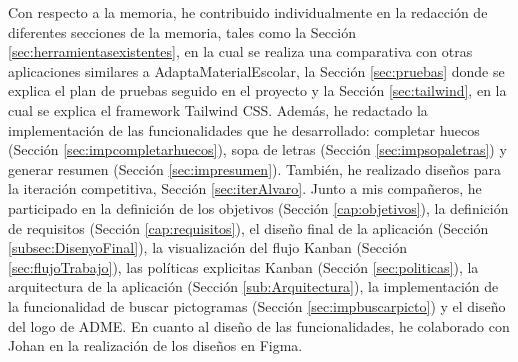 Con respecto a la memoria, he contribuido individualmente en la redacción de diferentes secciones de la memoria, tales como la Sección \ref{sec:herramientasexistentes}, en la cual se realiza una comparativa con otras aplicaciones similares a AdaptaMaterialEscolar, la Sección \ref{sec:pruebas} donde se explica el plan de pruebas seguido en el proyecto y la Sección \ref{sec:tailwind}, en la cual se explica el framework Tailwind CSS. Además, he redactado la implementación de las funcionalidades que he desarrollado: completar huecos (Sección \ref{sec:impcompletarhuecos}), sopa de letras (Sección \ref{sec:impsopaletras}) y generar resumen (Sección \ref{sec:impresumen}). También, he realizado diseños para la iteración competitiva, Sección \ref{sec:iterAlvaro}. Junto a mis compañeros, he participado en la definición de los objetivos (Sección \ref{cap:objetivos}), la definición de requisitos (Sección \ref{cap:requisitos}), el diseño final de la aplicación (Sección \ref{subsec:DisenyoFinal}), la visualización del flujo Kanban (Sección \ref{sec:flujoTrabajo}), las políticas explicitas Kanban (Sección \ref{sec:politicas}), la arquitectura de la aplicación (Sección \ref{sub:Arquitectura}), la implementación de la funcionalidad de buscar pictogramas (Sección \ref{sec:impbuscarpicto}) y el diseño del logo de ADME. En cuanto al diseño de las funcionalidades, he colaborado con Johan en la realización de los diseños en Figma.

